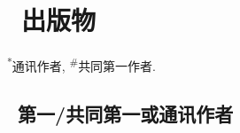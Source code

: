 \newcommand{\Revision}{\songtix{返修}}
\newcommand{\Review}{\songtix{审稿}}
\newcommand{\Submitted}{\songtix{投稿}}
\newcommand{\CS}{\textsuperscript{*}} %
\newcommand{\CF}{\textsuperscript{\#}} %

\section{\texorpdfstring{\faBook\ 出版物}{出版物}}
\CS 通讯作者, \CF 共同第一作者.

\subsection*{\texorpdfstring{\faBook\ 第一/共同第一或通讯作者}{第一/共同第一或通讯作者}}
